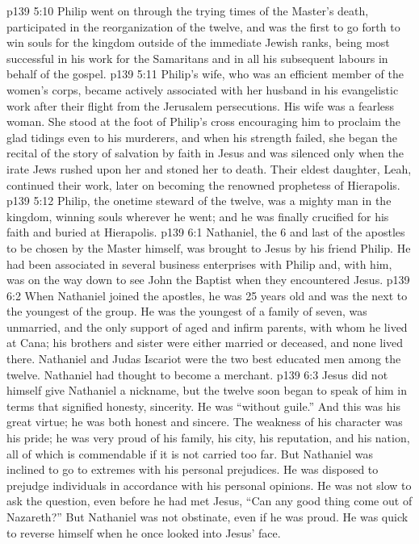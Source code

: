 \vs p139 5:10 Philip went on through the trying times of the Master’s death, participated in the reorganization of the twelve, and was the first to go forth to win souls for the kingdom outside of the immediate Jewish ranks, being most successful in his work for the Samaritans and in all his subsequent labours in behalf of the gospel.
\vs p139 5:11 \pc Philip’s wife, who was an efficient member of the women’s corps, became actively associated with her husband in his evangelistic work after their flight from the Jerusalem persecutions. His wife was a fearless woman. She stood at the foot of Philip’s cross encouraging him to proclaim the glad tidings even to his murderers, and when his strength failed, she began the recital of the story of salvation by faith in Jesus and was silenced only when the irate Jews rushed upon her and stoned her to death. Their eldest daughter, Leah, continued their work, later on becoming the renowned prophetess of Hierapolis.
\vs p139 5:12 \pc Philip, the onetime steward of the twelve, was a mighty man in the kingdom, winning souls wherever he went; and he was finally crucified for his faith and buried at Hierapolis.
\vs p139 6:1 Nathaniel, the 6 and last of the apostles to be chosen by the Master himself, was brought to Jesus by his friend Philip. He had been associated in several business enterprises with Philip and, with him, was on the way down to see John the Baptist when they encountered Jesus.
\vs p139 6:2 When Nathaniel joined the apostles, he was 25 years old and was the next to the youngest of the group. He was the youngest of a family of seven, was unmarried, and the only support of aged and infirm parents, with whom he lived at Cana; his brothers and sister were either married or deceased, and none lived there. Nathaniel and Judas Iscariot were the two best educated men among the twelve. Nathaniel had thought to become a merchant.
\vs p139 6:3 \pc Jesus did not himself give Nathaniel a nickname, but the twelve soon began to speak of him in terms that signified honesty, sincerity. He was “without guile.” And this was his great virtue; he was both honest and sincere. The weakness of his character was his pride; he was very proud of his family, his city, his reputation, and his nation, all of which is commendable if it is not carried too far. But Nathaniel was inclined to go to extremes with his personal prejudices. He was disposed to prejudge individuals in accordance with his personal opinions. He was not slow to ask the question, even before he had met Jesus, “Can any good thing come out of Nazareth?” But Nathaniel was not obstinate, even if he was proud. He was quick to reverse himself when he once looked into Jesus’ face.
